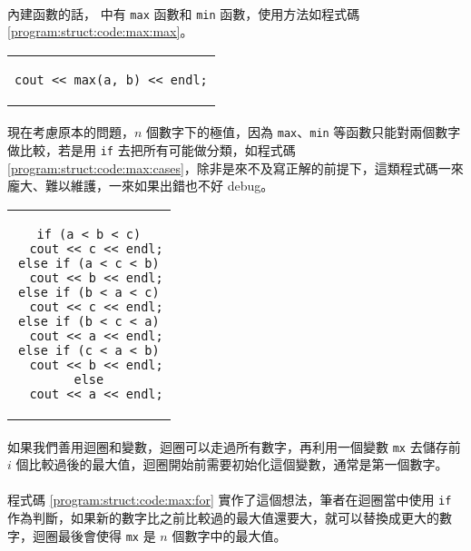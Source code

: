 \documentclass[12pt,a4paper,oneside]{report}
\begin{document}
\begin{CJK}{UTF8}{bkai}
\paragraph{}內建函數的話， 中有 \lstinline!max! 函數和 \lstinline!min! 函數，使用方法如程式碼 \ref{program:struct:code:max:max}。

\begin{code}[h!]
\centering
\begin{tabular}{c}
\begin{lstlisting}
cout << max(a, b) << endl;
\end{lstlisting}
\end{tabular}
\caption{\lstinline!max! 求最大值}
\label{program:struct:code:max:max}
\end{code}

\paragraph{}現在考慮原本的問題，$n$ 個數字下的極值，因為 \lstinline!max!、\lstinline!min! 等函數只能對兩個數字做比較，若是用 \lstinline!if! 去把所有可能做分類，如程式碼 \ref{program:struct:code:max:cases}，除非是來不及寫正解的前提下，這類程式碼一來龐大、難以維護，一來如果出錯也不好 debug。

\begin{code}[h!]
\centering
\begin{tabular}{c}
\begin{lstlisting}
if (a < b < c)
  cout << c << endl;
else if (a < c < b)
  cout << b << endl;
else if (b < a < c)
  cout << c << endl;
else if (b < c < a)
  cout << a << endl;
else if (c < a < b)
  cout << b << endl;
else
  cout << a << endl;
\end{lstlisting}
\end{tabular}
\caption{\lstinline!if! 求 3 個數字最大值}
\label{program:struct:code:max:cases}
\end{code}

\paragraph{}如果我們善用迴圈和變數，迴圈可以走過所有數字，再利用一個變數 \lstinline!mx! 去儲存前 $i$ 個比較過後的最大值，迴圈開始前需要初始化這個變數，通常是第一個數字。

\paragraph{}程式碼 \ref{program:struct:code:max:for} 實作了這個想法，筆者在迴圈當中使用 \lstinline!if! 作為判斷，如果新的數字比之前比較過的最大值還要大，就可以替換成更大的數字，迴圈最後會使得 \lstinline!mx! 是 $n$ 個數字中的最大值。


\end{CJK}
\end{document}
